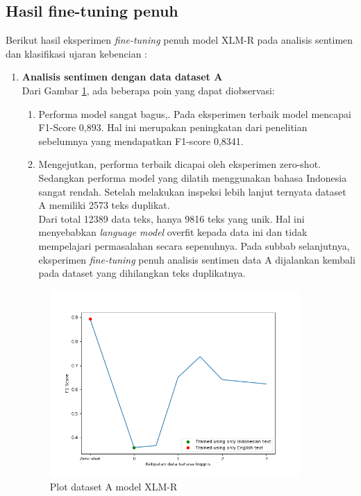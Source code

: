     \subsection{Hasil fine-tuning penuh}
        Berikut hasil eksperimen \textit{fine-tuning} penuh model XLM-R pada analisis sentimen dan klasifikasi ujaran kebencian :
        \begin{enumerate}
            \item \textbf{Analisis sentimen dengan data dataset A} \\
            Dari Gambar \ref{fig:plot_full_trip_xlmr}, ada beberapa poin yang dapat diobservasi:
            \begin{enumerate}
                \item Performa model sangat bagus,. Pada eksperimen terbaik model mencapai F1-Score 0,893. Hal ini merupakan peningkatan dari penelitian sebelumnya yang mendapatkan F1-score 0,8341.
                \item Mengejutkan, performa terbaik dicapai oleh eksperimen zero-shot. Sedangkan performa model yang dilatih menggunakan bahasa Indonesia sangat rendah. Setelah melakukan inspeksi lebih lanjut ternyata dataset A memiliki 2573 teks duplikat. \\
                Dari total 12389 data teks, hanya 9816 teks yang unik. Hal ini menyebabkan \textit{language model} overfit kepada data ini dan tidak mempelajari permasalahan secara sepenuhnya. Pada subbab selanjutnya, eksperimen \textit{fine-tuning} penuh analisis sentimen data A dijalankan kembali pada dataset yang dihilangkan teks duplikatnya.
            \end{enumerate} 
             
            \begin{figure}[htb]
                \centering
                \includegraphics[width=0.9\textwidth]{resources/plot-full-trip-advisor-xlmr.png}
                \caption{Plot dataset A model XLM-R}
                \label{fig:plot_full_trip_xlmr}
            \end{figure}
            


\end{enumerate}
